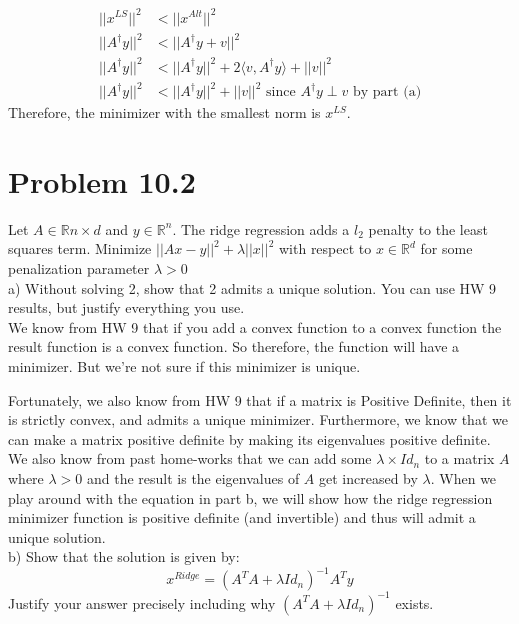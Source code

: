 \documentclass[12pt,twoside]{article}
\newcommand{\R}{\mathbb{R}}
\begin{document}
\begin{equation}
    \begin{split}
        ||x^{LS}||^2 &< ||x^{Alt}||^2 \\ 
        ||A^{\dagger}y||^2 &< ||A^{\dagger}y + v ||^2 \\ 
        ||A^{\dagger}y||^2 &< ||A^{\dagger}y||^2 + 2\langle v, A^{\dagger}y \rangle + ||v ||^2 \\     
        ||A^{\dagger}y||^2 &< ||A^{\dagger}y||^2 + ||v ||^2 \text{ since } A^{\dagger}y \perp v \text{ by part (a)} 
    \end{split}
\end{equation}
Therefore, the minimizer with the smallest norm is $x^{LS}$.
 
 \newpage 
\section{Problem 10.2}
Let $A \in \R{n \times d}$ and $y\in \R^n$. The ridge regression adds a $l_2$ penalty to the least squares term. Minimize $||Ax-y||^2 + \lambda ||x||^2$ with respect to $x\in \R^d$ for some penalization parameter $\lambda > 0 $ \\ 

a) Without solving 2, show that 2 admits a unique solution. You can use HW 9 results, but justify everything you use. \\

We know from HW 9 that if you add a convex function to a convex function the result function is a convex function. So therefore, the function will have a minimizer. But we're not sure if this minimizer is unique.

Fortunately, we also know from HW 9 that if a matrix is Positive Definite, then it is strictly convex, and admits a unique minimizer. Furthermore, we know that we can make a matrix positive definite by making its eigenvalues positive definite. We also know from past home-works that we can add some $\lambda \times Id_n$ to a matrix $A$ where $\lambda >0$ and the result is the eigenvalues of $A$ get increased by $\lambda$. When we play around with the equation in part b, we will show how the ridge regression minimizer function is positive definite (and invertible) and thus will admit a unique solution. \\


b) Show that the solution is given by:
$$
x^{Ridge} = (A^TA + \lambda Id_n)^{-1} A^Ty 
$$
Justify your answer precisely including why $(A^TA + \lambda Id_n)^{-1}$ exists. \\
\end{document}

